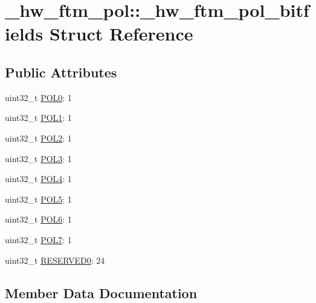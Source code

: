 \hypertarget{struct__hw__ftm__pol_1_1__hw__ftm__pol__bitfields}{}\section{\+\_\+hw\+\_\+ftm\+\_\+pol\+:\+:\+\_\+hw\+\_\+ftm\+\_\+pol\+\_\+bitfields Struct Reference}
\label{struct__hw__ftm__pol_1_1__hw__ftm__pol__bitfields}
\subsection*{Public Attributes}
\begin{DoxyCompactItemize}
\item 
uint32\+\_\+t \hyperlink{struct__hw__ftm__pol_1_1__hw__ftm__pol__bitfields_ae84c59205f6a27f68683b8932db1f1d6}{P\+O\+L0}\+: 1
\item 
uint32\+\_\+t \hyperlink{struct__hw__ftm__pol_1_1__hw__ftm__pol__bitfields_a1b3f9ba91ea736931f70bf5b458f2b83}{P\+O\+L1}\+: 1
\item 
uint32\+\_\+t \hyperlink{struct__hw__ftm__pol_1_1__hw__ftm__pol__bitfields_a39ea9d021ead060fb968eff06f3c648d}{P\+O\+L2}\+: 1
\item 
uint32\+\_\+t \hyperlink{struct__hw__ftm__pol_1_1__hw__ftm__pol__bitfields_aac20408fe18543c75224fb0f93543fc0}{P\+O\+L3}\+: 1
\item 
uint32\+\_\+t \hyperlink{struct__hw__ftm__pol_1_1__hw__ftm__pol__bitfields_ac2fe7c8cfb65d29cbb4c3935aaf625e5}{P\+O\+L4}\+: 1
\item 
uint32\+\_\+t \hyperlink{struct__hw__ftm__pol_1_1__hw__ftm__pol__bitfields_a590df1199759043e1a077f8fab3c89fd}{P\+O\+L5}\+: 1
\item 
uint32\+\_\+t \hyperlink{struct__hw__ftm__pol_1_1__hw__ftm__pol__bitfields_a4c884129876d3c82d497d0f67688ac27}{P\+O\+L6}\+: 1
\item 
uint32\+\_\+t \hyperlink{struct__hw__ftm__pol_1_1__hw__ftm__pol__bitfields_a17d9d520f75755c641b816b7ba566329}{P\+O\+L7}\+: 1
\item 
uint32\+\_\+t \hyperlink{struct__hw__ftm__pol_1_1__hw__ftm__pol__bitfields_ab28ee083da6720293fa204fab4e05ca8}{R\+E\+S\+E\+R\+V\+E\+D0}\+: 24
\end{DoxyCompactItemize}


\subsection{Member Data Documentation}

